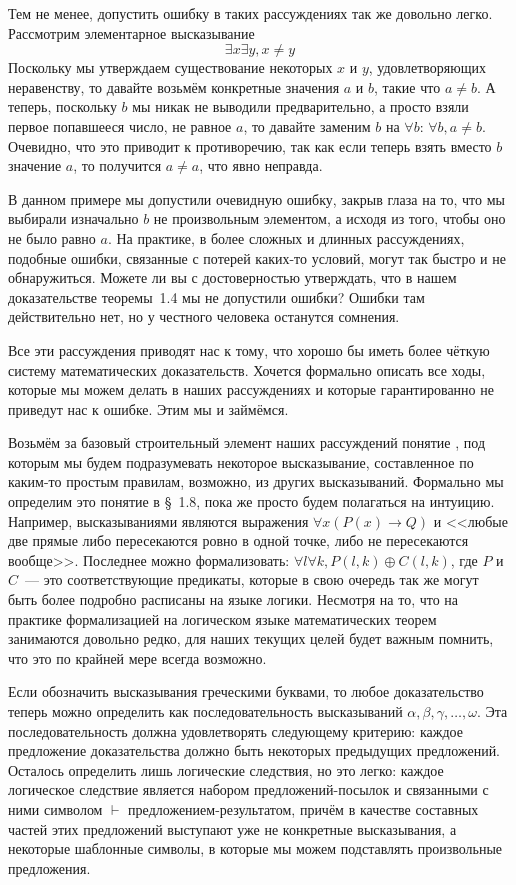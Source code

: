Тем не менее, допустить ошибку в таких рассуждениях так же довольно легко. Рассмотрим элементарное высказывание $$\exists x \exists y, x\not= y$$
Поскольку мы утверждаем существование некоторых $x$ и $y$, удовлетворяющих неравенству, то давайте возьмём конкретные значения $a$ и $b$, такие что $a\not= b$. А теперь, поскольку $b$ мы никак не выводили предварительно, а просто взяли первое попавшееся число, не равное $a$, то давайте заменим $b$ на $\forall b$: $\forall b, a\not= b$. Очевидно, что это приводит к противоречию, так как если теперь взять вместо $b$ значение $a$, то получится $a\not= a$, что явно неправда.

В данном примере мы допустили очевидную ошибку, закрыв глаза на то, что мы выбирали изначально $b$ не произвольным элементом, а исходя из того, чтобы оно не было равно $a$. На практике, в более сложных и длинных рассуждениях, подобные ошибки, связанные с потерей каких-то условий, могут так быстро и не обнаружиться. Можете ли вы с достоверностью утверждать, что в нашем доказательстве теоремы~1.4 мы не допустили ошибки? Ошибки там действительно нет, но у честного человека останутся сомнения.

Все эти рассуждения приводят нас к тому, что хорошо бы иметь более чёткую систему математических доказательств. Хочется формально описать все ходы, которые мы можем делать в наших рассуждениях и которые гарантированно не приведут нас к ошибке. Этим мы и займёмся.

Возьмём за базовый строительный элемент наших рассуждений понятие , под которым мы будем подразумевать некоторое высказывание, составленное по каким-то простым правилам, возможно, из других высказываний. Формально мы определим это понятие в \S~1.8, пока же просто будем полагаться на интуицию. Например, высказываниями являются выражения $\forall x (P(x)\to Q)$ и <<любые две прямые либо пересекаются ровно в одной точке, либо не пересекаются вообще>>. Последнее можно формализовать: $\forall l \forall k, P(l, k) \oplus C(l, k)$, где $P$ и $C$~--- это соответствующие предикаты, которые в свою очередь так же могут быть более подробно расписаны на языке логики. Несмотря на то, что на практике формализацией на логическом языке математических теорем занимаются довольно редко, для наших текущих целей будет важным помнить, что это по крайней мере всегда возможно.

Если обозначить высказывания греческими буквами, то любое доказательство теперь можно определить как последовательность высказываний $\alpha, \beta, \gamma, \ldots, \omega$. Эта последовательность должна удовлетворять следующему критерию: каждое предложение доказательства должно быть  некоторых предыдущих предложений. Осталось определить лишь логические следствия, но это легко: каждое логическое следствие является набором предложений-посылок и связанными с ними символом $\vdash$ предложением-результатом, причём в качестве составных частей этих предложений выступают уже не конкретные высказывания, а некоторые шаблонные символы, в которые мы можем подставлять произвольные предложения.


